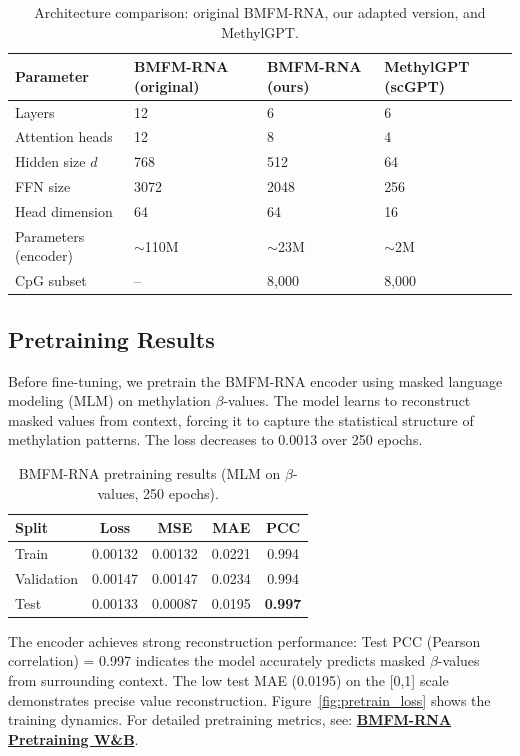 \documentclass[11pt]{article}
\begin{document}
\begin{table}[H]
\centering
\caption{Architecture comparison: original BMFM-RNA, our adapted version, and MethylGPT.}
\label{tab:scbert_config}
\begin{tabular}{llll}
\toprule
Parameter & BMFM-RNA (original) & BMFM-RNA (ours) & MethylGPT (scGPT) \\
\midrule
Layers & 12 & 6 & 6 \\
Attention heads & 12 & 8 & 4 \\
Hidden size $d$ & 768 & 512 & 64 \\
FFN size & 3072 & 2048 & 256 \\
Head dimension & 64 & 64 & 16 \\
Parameters (encoder) & $\sim$110M & $\sim$23M & $\sim$2M \\
CpG subset & -- & 8{,}000 & 8{,}000 \\
\bottomrule
\end{tabular}
\end{table}

\subsection{Pretraining Results}

Before fine-tuning, we pretrain the BMFM-RNA encoder using masked language modeling (MLM) on methylation $\beta$-values. The model learns to reconstruct masked values from context, forcing it to capture the statistical structure of methylation patterns. The loss decreases to 0.0013 over 250 epochs.

\begin{table}[h]
\centering
\caption{BMFM-RNA pretraining results (MLM on $\beta$-values, 250 epochs).}
\label{tab:pretrain_results}
\begin{tabular}{lcccc}
\toprule
Split & Loss & MSE & MAE & PCC \\
\midrule
Train & 0.00132 & 0.00132 & 0.0221 & 0.994 \\
Validation & 0.00147 & 0.00147 & 0.0234 & 0.994 \\
Test & 0.00133 & 0.00087 & 0.0195 & \textbf{0.997} \\
\bottomrule
\end{tabular}
\end{table}

\noindent The encoder achieves strong reconstruction performance: Test PCC (Pearson correlation) = 0.997 indicates the model accurately predicts masked $\beta$-values from surrounding context. The low test MAE (0.0195) on the [0,1] scale demonstrates precise value reconstruction. Figure~\ref{fig:pretrain_loss} shows the training dynamics.
For detailed pretraining metrics, see: \href{https://wandb.ai/netanelazran11-hebrew-university-of-jerusalem/pretrain-fixed2048-bmfm-rna-methylation/workspace?nw=nwusernetanelazran11}{\textbf{BMFM-RNA Pretraining W\&B}}.
\end{document}
